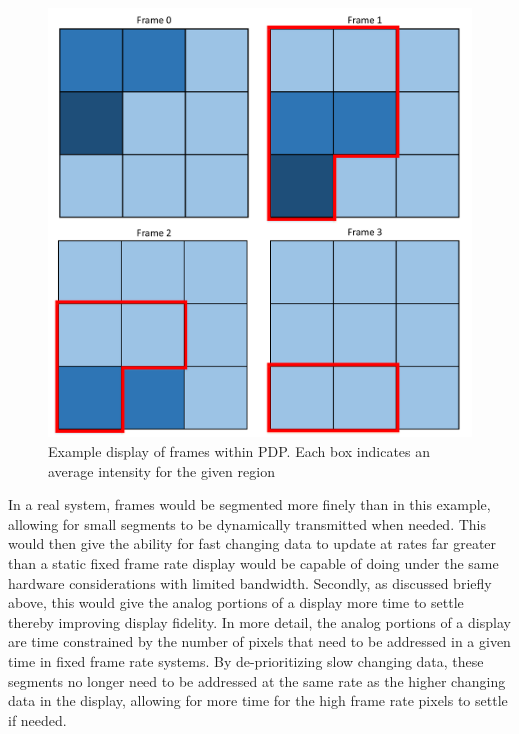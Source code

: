 \begin{figure}
        \centering
        \includegraphics[width=1.0\textwidth]{fig/frames.pdf}
        \caption{Example display of frames within PDP. Each box indicates an average intensity for the given region}
        \label{fig:frames}
\end{figure}

In a real system, frames would be segmented more finely than in this example, allowing for small segments to be dynamically transmitted when needed. This would then give the ability for fast changing data to update at rates far greater than a static fixed frame rate display would be capable of doing under the same hardware considerations with limited bandwidth. Secondly, as discussed briefly above, this would give the analog portions of a display more time to settle thereby improving display fidelity. In more detail, the analog portions of a display are time constrained by the number of pixels that need to be addressed in a given time in fixed frame rate systems. By de-prioritizing slow changing data, these segments no longer need to be addressed at the same rate as the higher changing data in the display, allowing for more time for the high frame rate pixels to settle if needed.
